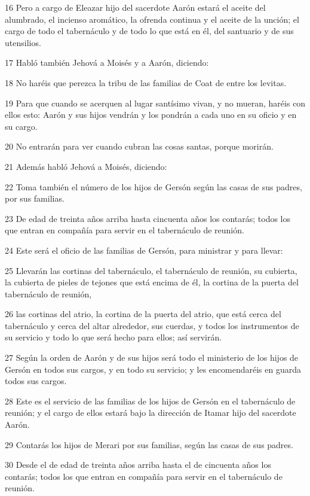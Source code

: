 \par 16 Pero a cargo de Eleazar hijo del sacerdote Aarón estará el aceite del alumbrado, el incienso aromático, la ofrenda continua y el aceite de la unción; el cargo de todo el tabernáculo y de todo lo que está en él, del santuario y de sus utensilios.
\par 17 Habló también Jehová a Moisés y a Aarón, diciendo:
\par 18 No haréis que perezca la tribu de las familias de Coat de entre los levitas. 
\par 19 Para que cuando se acerquen al lugar santísimo vivan, y no mueran, haréis con ellos esto: Aarón y sus hijos vendrán y los pondrán a cada uno en su oficio y en su cargo.
\par 20 No entrarán para ver cuando cubran las cosas santas, porque morirán.
\par 21 Además habló Jehová a Moisés, diciendo:
\par 22 Toma también el número de los hijos de Gersón según las casas de sus padres, por sus familias.
\par 23 De edad de treinta años arriba hasta cincuenta años los contarás; todos los que entran en compañía para servir en el tabernáculo de reunión.
\par 24 Este será el oficio de las familias de Gersón, para ministrar y para llevar:
\par 25 Llevarán las cortinas del tabernáculo, el tabernáculo de reunión, su cubierta, la cubierta de pieles de tejones que está encima de él, la cortina de la puerta del tabernáculo de reunión, 
\par 26 las cortinas del atrio, la cortina de la puerta del atrio, que está cerca del tabernáculo y cerca del altar alrededor, sus cuerdas, y todos los instrumentos de su servicio y todo lo que será hecho para ellos; así servirán.
\par 27 Según la orden de Aarón y de sus hijos será todo el ministerio de los hijos de Gersón en todos sus cargos, y en todo su servicio; y les encomendaréis en guarda todos sus cargos.
\par 28 Este es el servicio de las familias de los hijos de Gersón en el tabernáculo de reunión; y el cargo de ellos estará bajo la dirección de Itamar hijo del sacerdote Aarón.
\par 29 Contarás los hijos de Merari por sus familias, según las casas de sus padres.
\par 30 Desde el de edad de treinta años arriba hasta el de cincuenta años los contarás; todos los que entran en compañía para servir en el tabernáculo de reunión.
